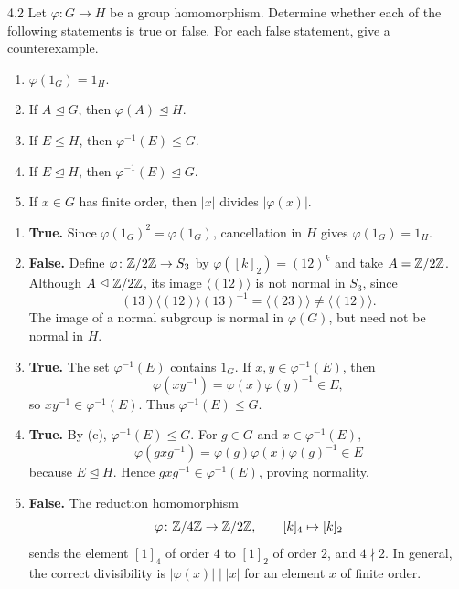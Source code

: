 \documentclass[11pt,oneside]{article}
\begin{document}
\begin{problem}{4.2}
Let $\varphi\colon G\to H$ be a group homomorphism. Determine whether each of the following statements is true or false. For each false statement, give a counterexample.
\begin{enumerate}[label=(\alph*),leftmargin=2.5em,itemsep=0.25em,topsep=0.4em]
    \item $\varphi(1_G)=1_H$.
    \item If $A\trianglelefteq G$, then $\varphi(A)\trianglelefteq H$.
    \item If $E\le H$, then $\varphi^{-1}(E)\le G$.
    \item If $E\trianglelefteq H$, then $\varphi^{-1}(E)\trianglelefteq G$.
    \item If $x\in G$ has finite order, then $|x|$ divides $|\varphi(x)|$.
\end{enumerate}
\end{problem}

\begin{solution}
\begin{enumerate}[label=(\alph*),leftmargin=2.5em,itemsep=0.55em,topsep=0.2em]
    \item \textbf{True.} Since $\varphi(1_G)^2=\varphi(1_G)$, cancellation in $H$ gives $\varphi(1_G)=1_H$.

    \item \textbf{False.} Define $\varphi\colon\mathbb{Z}/2\mathbb{Z}\to S_3$ by $\varphi([k]_2)=(12)^k$ and take $A=\mathbb{Z}/2\mathbb{Z}$. Although $A\trianglelefteq\mathbb{Z}/2\mathbb{Z}$, its image $\langle(12)\rangle$ is not normal in $S_3$, since
    \[
        (13)\langle(12)\rangle(13)^{-1}
        =\langle(23)\rangle\neq\langle(12)\rangle.
    \]
    The image of a normal subgroup is normal in $\varphi(G)$, but need not be normal in $H$.

    \item \textbf{True.} The set $\varphi^{-1}(E)$ contains $1_G$. If $x,y\in\varphi^{-1}(E)$, then
    \[
        \varphi(xy^{-1})=\varphi(x)\varphi(y)^{-1}\in E,
    \]
    so $xy^{-1}\in\varphi^{-1}(E)$. Thus $\varphi^{-1}(E)\le G$.

    \item \textbf{True.} By (c), $\varphi^{-1}(E)\le G$. For $g\in G$ and $x\in\varphi^{-1}(E)$,
    \[
        \varphi(gxg^{-1})
        =\varphi(g)\varphi(x)\varphi(g)^{-1}\in E
    \]
    because $E\trianglelefteq H$. Hence $gxg^{-1}\in\varphi^{-1}(E)$, proving normality.

    \item \textbf{False.} The reduction homomorphism
    \[
        \varphi\colon\mathbb{Z}/4\mathbb{Z}\to\mathbb{Z}/2\mathbb{Z},
        \qquad [k]_4\mapsto[k]_2
    \]
    sends the element $[1]_4$ of order $4$ to $[1]_2$ of order $2$, and $4\nmid2$. In general, the correct divisibility is $|\varphi(x)|\mid|x|$ for an element $x$ of finite order.
\end{enumerate}
\end{solution}
\end{document}
